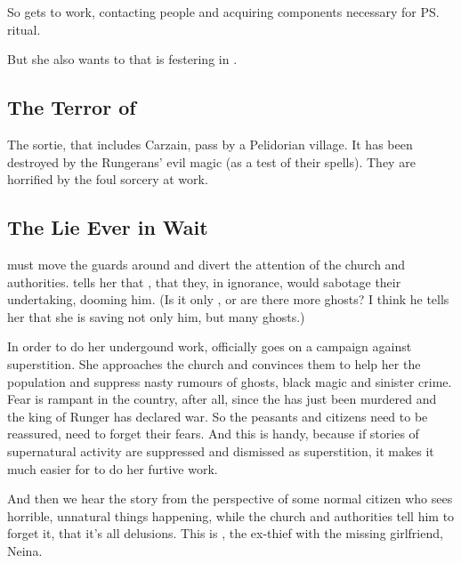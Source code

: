 So \Tiroco{} gets to work, contacting people and acquiring components necessary for \ps{\Icor}  ritual. 

But she also wants to  that is festering in \Malcur. 









\subsection{The Terror of \EreshKal}
The sortie, that includes Carzain, pass by a Pelidorian village. 
It has been destroyed by the Rungerans' evil magic (as a test of their spells). 
They are horrified by the foul sorcery at work. 








\subsection{The \Qliphoth{} Lie Ever in Wait}
\Tiroco{} must move the guards around and divert the attention of the church and authorities. \Icor{} tells her that , that they, in ignorance, would sabotage their undertaking, dooming him. (Is it only \Icor{}, or are there more ghosts? I think he tells her that she is saving not only him, but many ghosts.) 

In order to do her undergound work, \Tiroco{} officially goes on a campaign against superstition. She approaches the church and convinces them to help her  the population and suppress nasty rumours of ghosts, black magic and sinister crime. 
Fear is rampant in the country, after all, since the \rayuth has just been murdered and the king of Runger has declared war. So the peasants and citizens need to be reassured, need to forget their fears. 
And this is handy, because if stories of supernatural activity are suppressed and dismissed as superstition, it makes it much easier for \Tiroco{} to do her furtive work. 

And then we hear the story from the perspective of some normal citizen who sees horrible, unnatural things happening, while the church and authorities tell him to forget it, that it's all delusions. This is , the ex-thief with the missing girlfriend, Neina. 

